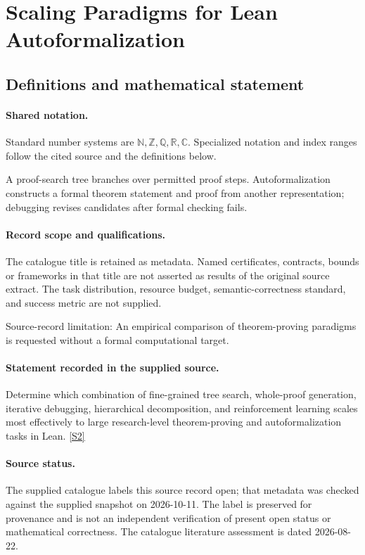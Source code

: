 \documentclass[11pt]{article}
\newcommand{\sref}[2]{\hyperlink{source:#1:#2}{[S#2]}}
\begin{document}
\section{Scaling Paradigms for Lean Autoformalization}\label{statement}

\subsection{Definitions and mathematical statement}

\paragraph{Shared notation.}Standard number systems are $\mathbb N,\mathbb Z,\mathbb Q,\mathbb R,\mathbb C$. Specialized notation and index ranges follow the cited source and the definitions below.


A proof-search tree branches over permitted proof steps. Autoformalization constructs a formal theorem statement and proof from another representation; debugging revises candidates after formal checking fails.
\paragraph{Record scope and qualifications.}
The catalogue title is retained as metadata. Named certificates, contracts, bounds or frameworks in that title are not asserted as results of the original source extract.
The task distribution, resource budget, semantic-correctness standard, and success metric are not supplied.

Source-record limitation: An empirical comparison of theorem-proving paradigms is requested without a formal computational target.
\paragraph{Statement recorded in the supplied source.}
Determine which combination of fine-grained tree search, whole-proof generation, iterative debugging, hierarchical decomposition, and reinforcement learning scales most effectively to large research-level theorem-proving and autoformalization tasks in Lean. \sref{statement}{2}
\paragraph{Source status.}
The supplied catalogue labels this source record open; that metadata was checked against the supplied snapshot on 2026-10-11. The label is preserved for provenance and is not an independent verification of present open status or mathematical correctness. The catalogue literature assessment is dated 2026-08-22.
\end{document}
